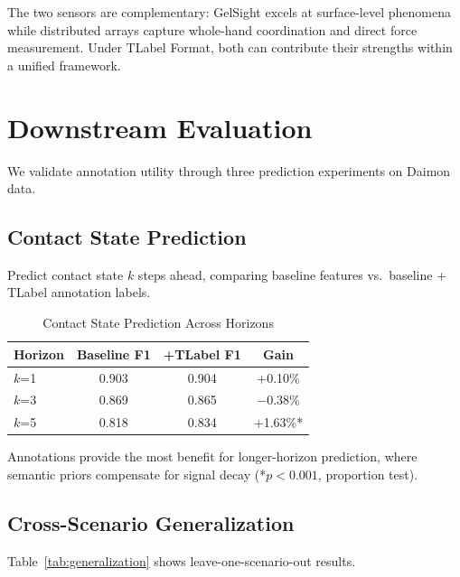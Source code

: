 \documentclass[conference]{IEEEtran}
\begin{document}
The two sensors are complementary: GelSight excels at surface-level phenomena while distributed arrays capture whole-hand coordination and direct force measurement. Under TLabel Format, both can contribute their strengths within a unified framework.

\section{Downstream Evaluation}

We validate annotation utility through three prediction experiments on Daimon data.

\subsection{Contact State Prediction}

Predict contact state $k$ steps ahead, comparing baseline features vs.\ baseline + TLabel annotation labels.

\begin{table}[t]
\centering
\caption{Contact State Prediction Across Horizons}
\label{tab:contact_pred}
\begin{tabular}{lccc}
\toprule
\textbf{Horizon} & \textbf{Baseline F1} & \textbf{+TLabel F1} & \textbf{Gain} \\
\midrule
$k$=1 & 0.903 & 0.904 & +0.10\% \\
$k$=3 & 0.869 & 0.865 & $-$0.38\% \\
$k$=5 & 0.818 & 0.834 & +1.63\%* \\
\bottomrule
\end{tabular}
\end{table}

Annotations provide the most benefit for longer-horizon prediction, where semantic priors compensate for signal decay (*$p<0.001$, proportion test).

\subsection{Cross-Scenario Generalization}

Table~\ref{tab:generalization} shows leave-one-scenario-out results.
\end{document}
